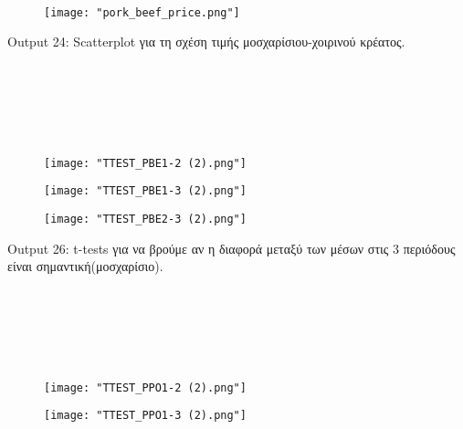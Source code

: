 \documentclass[10pt]{article}
\begin{document}
\

\begin{figure}[H]
    \centering
    \texttt{[image: "pork\_beef\_price.png"]}
    
    \label{fig:galaxy}
\end{figure}

\begin{centering}

\renewcommand{\caption}{Output 24: }
\caption {Scatterplot για τη σχέση τιμής μοσχαρίσιου-χοιρινού κρέατος. }
\end{centering}



\

\

\

\begin{figure}[H]
    \centering
    \texttt{[image: "TTEST\_PBE1-2 (2).png"]}
    
    \label{fig:galaxy}
\end{figure}

\begin{figure}[H]
    \centering
    \texttt{[image: "TTEST\_PBE1-3 (2).png"]}
    
    \label{fig:galaxy}
\end{figure}

\begin{figure}[H]
    \centering
    \texttt{[image: "TTEST\_PBE2-3 (2).png"]}
    
    \label{fig:galaxy}
\end{figure}

\begin{centering}


\renewcommand{\caption}{Output 26: }
\caption { t-tests για να βρούμε αν η διαφορά μεταξύ των μέσων στις 3 περιόδους είναι σημαντική(μοσχαρίσιο). }
\end{centering}

\

\

\

\begin{figure}[H]
    \centering
    \texttt{[image: "TTEST\_PPO1-2 (2).png"]}
    
    \label{fig:galaxy}
\end{figure}

\begin{figure}[H]
    \centering
    \texttt{[image: "TTEST\_PPO1-3 (2).png"]}
    
    \label{fig:galaxy}
\end{figure}
\end{document}
